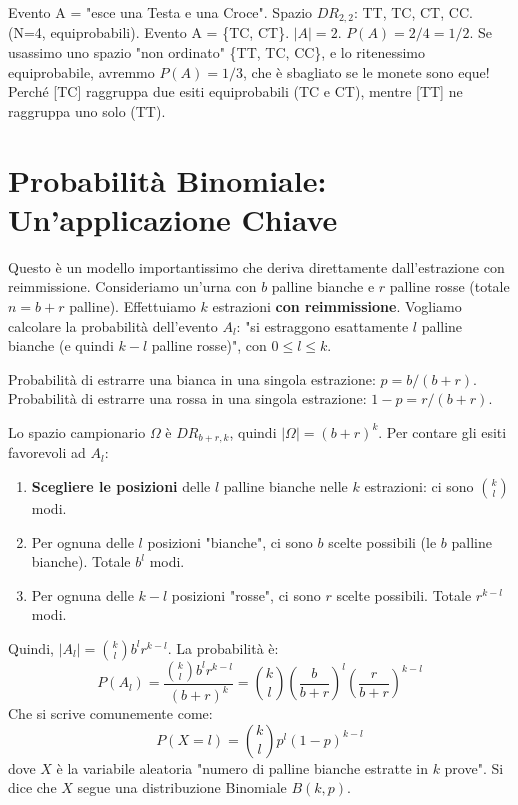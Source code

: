 \begin{example}
Evento A = "esce una Testa e una Croce".
Spazio $DR_{2,2}$: TT, TC, CT, CC. (N=4, equiprobabili).
Evento A = \{TC, CT\}. $|A|=2$. $P(A)=2/4=1/2$.
Se usassimo uno spazio "non ordinato" \{TT, TC, CC\}, e lo ritenessimo equiprobabile, avremmo $P(A)=1/3$, che è sbagliato se le monete sono eque!
Perché [TC] raggruppa due esiti equiprobabili (TC e CT), mentre [TT] ne raggruppa uno solo (TT).
\end{example}

\section{Probabilità Binomiale: Un'applicazione Chiave}
Questo è un modello importantissimo che deriva direttamente dall'estrazione con reimmissione.
Consideriamo un'urna con $b$ palline bianche e $r$ palline rosse (totale $n=b+r$ palline).
Effettuiamo $k$ estrazioni \textbf{con reimmissione}.
Vogliamo calcolare la probabilità dell'evento $A_l$: "si estraggono esattamente $l$ palline bianche (e quindi $k-l$ palline rosse)", con $0 \le l \le k$.

Probabilità di estrarre una bianca in una singola estrazione: $p = b/(b+r)$.
Probabilità di estrarre una rossa in una singola estrazione: $1-p = r/(b+r)$.

Lo spazio campionario $\Omega$ è $DR_{b+r, k}$, quindi $|\Omega| = (b+r)^k$.
Per contare gli esiti favorevoli ad $A_l$:
\begin{enumerate}
    \item \textbf{Scegliere le posizioni} delle $l$ palline bianche nelle $k$ estrazioni: ci sono $\binom{k}{l}$ modi.
    \item Per ognuna delle $l$ posizioni "bianche", ci sono $b$ scelte possibili (le $b$ palline bianche). Totale $b^l$ modi.
    \item Per ognuna delle $k-l$ posizioni "rosse", ci sono $r$ scelte possibili. Totale $r^{k-l}$ modi.
\end{enumerate}
Quindi, $|A_l| = \binom{k}{l} b^l r^{k-l}$.
La probabilità è:
$$ P(A_l) = \frac{\binom{k}{l} b^l r^{k-l}}{(b+r)^k} = \binom{k}{l} \left(\frac{b}{b+r}\right)^l \left(\frac{r}{b+r}\right)^{k-l} $$
Che si scrive comunemente come:
$$ P(X=l) = \binom{k}{l} p^l (1-p)^{k-l} $$
dove $X$ è la variabile aleatoria "numero di palline bianche estratte in $k$ prove". Si dice che $X$ segue una distribuzione Binomiale $B(k,p)$.


